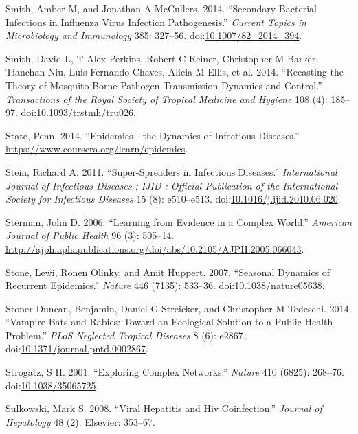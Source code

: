 \documentclass[]{book}
\theoremstyle{definition}
\theoremstyle{definition}
\theoremstyle{definition}
\theoremstyle{remark}
\begin{document}
\hypertarget{ref-smith14a}{}
Smith, Amber M, and Jonathan A McCullers. 2014. ``Secondary Bacterial
Infections in Influenza Virus Infection Pathogenesis.'' \emph{Current
Topics in Microbiology and Immunology} 385: 327--56.
doi:\href{https://doi.org/10.1007/82_2014_394}{10.1007/82\_2014\_394}.

\hypertarget{ref-smith14}{}
Smith, David L, T Alex Perkins, Robert C Reiner, Christopher M Barker,
Tianchan Niu, Luis Fernando Chaves, Alicia M Ellis, et al. 2014.
``Recasting the Theory of Mosquito-Borne Pathogen Transmission Dynamics
and Control.'' \emph{Transactions of the Royal Society of Tropical
Medicine and Hygiene} 108 (4): 185--97.
doi:\href{https://doi.org/10.1093/trstmh/tru026}{10.1093/trstmh/tru026}.

\hypertarget{ref-epimooc}{}
State, Penn. 2014. ``Epidemics - the Dynamics of Infectious Diseases.''
\url{https://www.coursera.org/learn/epidemics}.

\hypertarget{ref-stein11}{}
Stein, Richard A. 2011. ``Super-Spreaders in Infectious Diseases.''
\emph{International Journal of Infectious Diseases : IJID : Official
Publication of the International Society for Infectious Diseases} 15
(8): e510--e513.
doi:\href{https://doi.org/10.1016/j.ijid.2010.06.020}{10.1016/j.ijid.2010.06.020}.

\hypertarget{ref-sterman06}{}
Sterman, John D. 2006. ``Learning from Evidence in a Complex World.''
\emph{American Journal of Public Health} 96 (3): 505--14.
\url{http://ajph.aphapublications.org/doi/abs/10.2105/AJPH.2005.066043}.

\hypertarget{ref-stone07}{}
Stone, Lewi, Ronen Olinky, and Amit Huppert. 2007. ``Seasonal Dynamics
of Recurrent Epidemics.'' \emph{Nature} 446 (7135): 533--36.
doi:\href{https://doi.org/10.1038/nature05638}{10.1038/nature05638}.

\hypertarget{ref-stoner-duncan14}{}
Stoner-Duncan, Benjamin, Daniel G Streicker, and Christopher M Tedeschi.
2014. ``Vampire Bats and Rabies: Toward an Ecological Solution to a
Public Health Problem.'' \emph{PLoS Neglected Tropical Diseases} 8 (6):
e2867.
doi:\href{https://doi.org/10.1371/journal.pntd.0002867}{10.1371/journal.pntd.0002867}.

\hypertarget{ref-strogatz01}{}
Strogatz, S H. 2001. ``Exploring Complex Networks.'' \emph{Nature} 410
(6825): 268--76.
doi:\href{https://doi.org/10.1038/35065725}{10.1038/35065725}.

\hypertarget{ref-sulkowski08}{}
Sulkowski, Mark S. 2008. ``Viral Hepatitis and Hiv Coinfection.''
\emph{Journal of Hepatology} 48 (2). Elsevier: 353--67.
\end{document}
